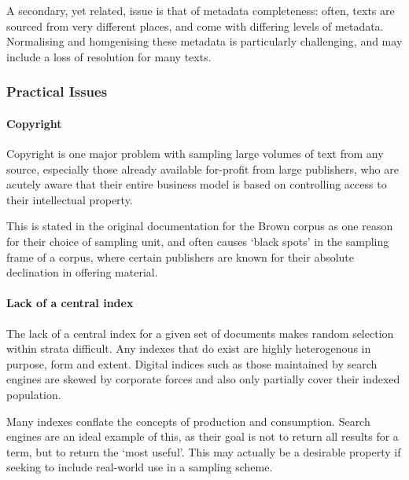 A secondary, yet related, issue is that of metadata completeness: often, texts are sourced from very different places, and come with differing levels of metadata.  Normalising and homgenising these metadata is particularly challenging, and may include a loss of resolution for many texts.






\subsubsection{Practical Issues}

\paragraph{Copyright}
Copyright is one major problem with sampling large volumes of text from any source, especially those already available for-profit from large publishers, who are acutely aware that their entire business model is based on controlling access to their intellectual property.

This is stated in the original documentation for the Brown corpus as one reason for their choice of sampling unit, and often causes `black spots' in the sampling frame of a corpus, where certain publishers are known for their absolute declination in offering material.


\paragraph{Lack of a central index}
The lack of a central index for a given set of documents makes random selection within strata difficult. Any indexes that do exist are highly heterogenous in purpose, form and extent. Digital indices such as those maintained by search engines are skewed by corporate forces and also only partially cover their indexed population.

Many indexes conflate the concepts of production and consumption.  Search engines are an ideal example of this, as their goal is not to return all results for a term, but to return the `most useful'.  This may actually be a desirable property if seeking to include real-world use in a sampling scheme.




